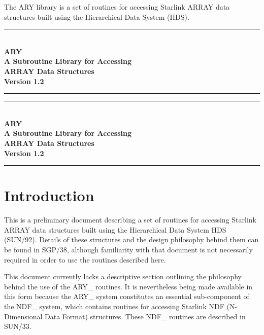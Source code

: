 \documentclass[twoside,11pt]{article}
\newcommand{\stardocinitials}  {SUN}
\newcommand{\stardocnumber}    {11.4}
\newcommand{\stardoctitle}     {ARY\\[2.5ex]
                                A Subroutine Library for Accessing\\
                                ARRAY Data Structures}
\newcommand{\stardocversion}   {Version 1.2}
\newcommand{\stardocabstract}  {%
The ARY library is a set of routines for accessing Starlink ARRAY data 
structures built using the Hierarchical Data System (HDS).
}
\newcommand{\stardocname}{\stardocinitials /\stardocnumber}
\newenvironment{latexonly}{}{}
\newcommand{\xref}[3]{#1}
\newcommand{\xlabel}[1]{}
\newcommand{\latexonlytoc}[0]{\tableofcontents}
\renewcommand{\thepage}{\roman{page}}
\begin{document}
\stardocabstract
  \newpage
  \begin{latexonly}
    \null\vspace {5mm}
    \begin {center}
    \rule{80mm}{0.5mm} \\ [1ex]
    {\Large\bf \stardoctitle \\ [2.5ex]
               \stardocversion} \\ [2ex]
    \rule{80mm}{0.5mm}
    \end{center}
    \setlength{\parskip}{0mm}
    \latexonlytoc
    \setlength{\parskip}{\medskipamount}
    \markboth{\stardocname}{\stardocname}
  \end{latexonly}
\cleardoublepage
\renewcommand{\thepage}{\arabic{page}}
\setcounter{page}{1}
\begin{latexonly}
\null\vspace {5mm}
\begin {center}
\rule{80mm}{0.5mm} \\ [1ex]
{\Large\bf \stardoctitle \\ [2.5ex]
           \stardocversion} \\ [2ex]
\rule{80mm}{0.5mm}
\end{center}
\end{latexonly}


\section{\xlabel{introduction}Introduction}
\label{introduction}

This is a preliminary document describing a set of routines for accessing
Starlink ARRAY data structures built using the Hierarchical Data System HDS
(\xref{SUN/92}{sun92}{}).  Details of these structures and the design
philosophy behind them can be found in \xref{SGP/38}{sgp38}{}, although
familiarity with that document is not necessarily required in order to
use the routines described here.

This document currently lacks a descriptive section outlining the
philosophy behind the use of the ARY\_ routines.  It is nevertheless
being made available in this form because the ARY\_ system constitutes
an essential sub-component of the NDF\_ system, which contains routines
for accessing Starlink NDF (N-Dimensional Data Format) structures.
These NDF\_ routines are described in \xref{SUN/33}{sun33}{}.
\end{document}
